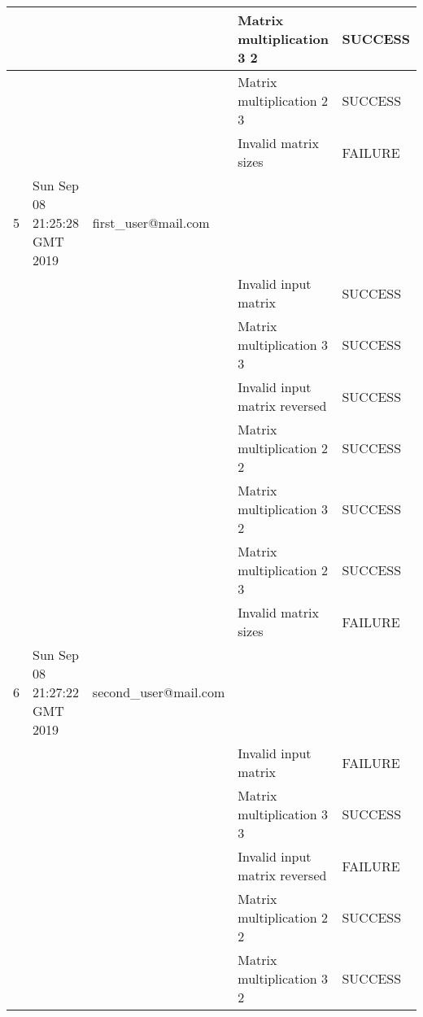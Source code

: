 \begin{center}
\begin{longtable}{|l|l|l|l|l|}
    &                              &                                 & Matrix multiplication 3 2     & SUCCESS \\ \hline
    &                              &                                 & Matrix multiplication 2 3     & SUCCESS \\ \hline
    &                              &                                 & Invalid matrix sizes          & FAILURE \\ \hline
    5     & Sun Sep 08 21:25:28 GMT 2019 & first\_user@mail.com &                               &         \\ \hline
    &                              &                                 & Invalid input matrix          & SUCCESS \\ \hline
    &                              &                                 & Matrix multiplication 3 3     & SUCCESS \\ \hline
    &                              &                                 & Invalid input matrix reversed & SUCCESS \\ \hline
    &                              &                                 & Matrix multiplication 2 2     & SUCCESS \\ \hline
    &                              &                                 & Matrix multiplication 3 2     & SUCCESS \\ \hline
    &                              &                                 & Matrix multiplication 2 3     & SUCCESS \\ \hline
    &                              &                                 & Invalid matrix sizes          & FAILURE \\ \hline
    6     & Sun Sep 08 21:27:22 GMT 2019 & second\_user@mail.com               &                               &         \\ \hline
    &                              &                                 & Invalid input matrix          & FAILURE \\ \hline
    &                              &                                 & Matrix multiplication 3 3     & SUCCESS \\ \hline
    &                              &                                 & Invalid input matrix reversed & FAILURE \\ \hline
    &                              &                                 & Matrix multiplication 2 2     & SUCCESS \\ \hline
    &                              &                                 & Matrix multiplication 3 2     & SUCCESS \\ \hline

\end{longtable}
\end{center}

